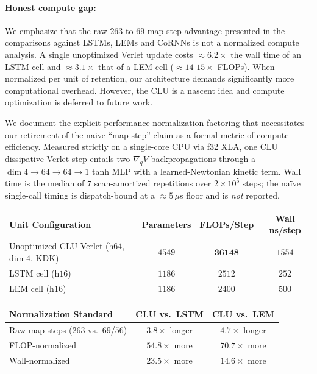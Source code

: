\documentclass[mlabstract,onecolumn]{jmlr}
\begin{document}
\paragraph{Honest compute gap:} We emphasize that the raw $263$-to-$69$ map-step advantage presented in the comparisons against LSTMs, LEMs and CoRNNs is not a normalized compute analysis. A single unoptimized Verlet update costs $\approx6.2\times$ the wall time of an LSTM cell and $\approx3.1\times$ that of a LEM cell ($\approx14$-$15\times$ FLOPs). When normalized per unit of retention, our architecture demands significantly more computational overhead. However, the CLU is a nascent idea and compute optimization is deferred to future work.

We document the explicit performance normalization factoring that necessitates our retirement of the naive ``map-step'' claim as a formal metric of compute efficiency. Measured strictly on a single-core CPU via f32 XLA, one CLU dissipative-Verlet step entails two $\nabla_qV$ backpropagations through a $\dim 4\to64\to64\to1$ tanh MLP with a learned-Newtonian kinetic term. Wall time is the median of $7$ scan-amortized repetitions over $2{\times}10^5$ steps; the na\"ive single-call timing is dispatch-bound at a $\approx5\,\mu$s floor and is \emph{not} reported.

\begin{center}
\begin{tabular}{lccc}
\toprule
Unit Configuration & Parameters & FLOPs/Step & Wall ns/step \\
\midrule
Unoptimized CLU Verlet (h$64$, dim $4$, KDK) & $4549$ & $\mathbf{36148}$ & $1554$ \\
LSTM cell (h$16$) & $1186$ & $2512$ & $252$ \\
LEM cell (h$16$) & $1186$ & $2400$ & $500$ \\
\bottomrule
\end{tabular}
\end{center}

\begin{center}
\begin{tabular}{lcc}
\toprule
Normalization Standard & CLU vs.\ LSTM & CLU vs.\ LEM \\
\midrule
Raw map-steps ($263$ vs.\ $69$/$56$) & $3.8\times$ longer & $4.7\times$ longer \\
FLOP-normalized & $\mathbf{54.8\times}$ more & $\mathbf{70.7\times}$ more \\
Wall-normalized & $\mathbf{23.5\times}$ more & $\mathbf{14.6\times}$ more \\
\bottomrule
\end{tabular}
\end{center}
\end{document}
